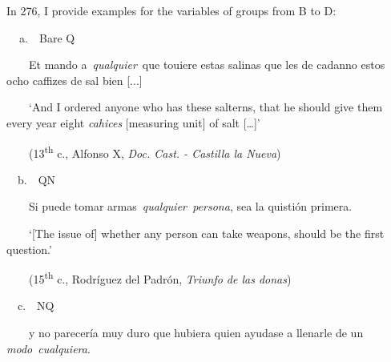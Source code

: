 \begin{styleStandard}
In 276, I provide examples for the variables of groups from B to D:
\end{styleStandard}

\begin{styleStandard}
\textbf{\ \ }a.\ \ Bare Q
\end{styleStandard}

\begin{styleStandard}
\ \ \ \ Et mando a~\textit{qualquier}~que touiere estas salinas que les de cadanno estos ocho caffizes de sal bien [...] 
\end{styleStandard}

\begin{styleStandard}
\ \ \ \ ‘And I ordered anyone who has these salterns, that he should give them every year eight \textit{cahices} [measuring unit] of salt […]’
\end{styleStandard}

\begin{styleStandard}
\ \ \ \ (13\textsuperscript{th }c., Alfonso X, \textit{Doc. Cast. - Castilla la Nueva})
\end{styleStandard}

\begin{styleStandard}
\ \ b.\ \ QN
\end{styleStandard}

\begin{styleStandard}
\ \ \ \ Si puede tomar armas~\textit{qualquier~persona}, sea la quistión primera. 
\end{styleStandard}

\begin{styleStandard}
\ \ \ \ ‘[The issue of] whether any person can take weapons, should be the first question.’
\end{styleStandard}

\begin{styleStandard}
\ \ \ \ (15\textsuperscript{th} c., Rodríguez del Padrón,\textit{ Triunfo de las donas})
\end{styleStandard}

\begin{styleStandard}
\ \ c.\ \ NQ
\end{styleStandard}

\begin{styleStandard}
\ \ \ \ y no parecería muy duro que hubiera quien ayudase a llenarle de un \textit{modo}~\textit{cualquiera}. 
\end{styleStandard}

